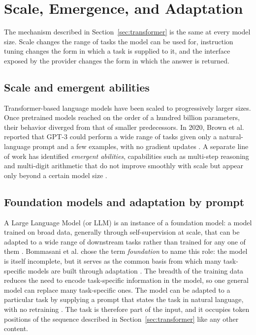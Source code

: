 \section{Scale, Emergence, and Adaptation}
\label{sec:scale-emergence}

The mechanism described in Section~\ref{sec:transformer} is the same at every model size. Scale changes the range of tasks the model can be used for, instruction tuning changes the form in which a task is supplied to it, and the interface exposed by the provider changes the form in which the answer is returned.

\subsection{Scale and emergent abilities}
\label{subsec:scale}

Transformer-based language models have been scaled to progressively larger sizes. Once pretrained models reached on the order of a hundred billion parameters, their behavior diverged from that of smaller predecessors. In 2020, Brown et al. reported that GPT-3 could perform a wide range of tasks given only a natural-language prompt and a few examples, with no gradient updates \cite{brownLanguageModelsAre2020}. A separate line of work has identified \emph{emergent abilities}, capabilities such as multi-step reasoning and multi-digit arithmetic that do not improve smoothly with scale but appear only beyond a certain model size \cite{weiEmergentAbilitiesLarge2022, zhaoSurveyLargeLanguage2026}.

\subsection{Foundation models and adaptation by prompt}
\label{subsec:foundation-models}

A Large Language Model (or LLM) is an instance of a foundation model: a model trained on broad data, generally through self-supervision at scale, that can be adapted to a wide range of downstream tasks rather than trained for any one of them \cite{bommasaniOpportunitiesRisksFoundation2022}. Bommasani et al. chose the term \emph{foundation} to name this role: the model is itself incomplete, but it serves as the common basis from which many task-specific models are built through adaptation \cite{bommasaniOpportunitiesRisksFoundation2022}. The breadth of the training data reduces the need to encode task-specific information in the model, so one general model can replace many task-specific ones. The model can be adapted to a particular task by supplying a prompt that states the task in natural language, with no retraining \cite{bommasaniOpportunitiesRisksFoundation2022,brownLanguageModelsAre2020}. The task is therefore part of the input, and it occupies token positions of the sequence described in Section~\ref{sec:transformer} like any other content.

